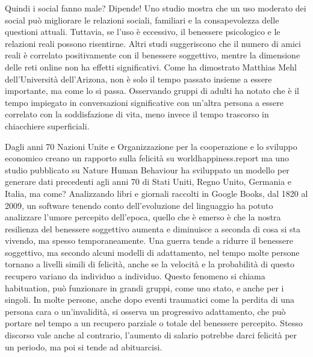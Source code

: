\documentclass[12pt]{book} %
\begin{document}
\begin{mdframed}[linewidth=1pt]
Quindi i social fanno male? Dipende! Uno studio mostra che un uso moderato dei social può migliorare le relazioni sociali, familiari e la consapevolezza delle questioni attuali. Tuttavia, se l’uso è eccessivo, il benessere psicologico e le relazioni reali possono risentirne. Altri studi  suggeriscono che il numero di amici reali è correlato positivamente con il benessere soggettivo, mentre la dimensione delle reti online non ha effetti significativi.
Come ha dimostrato Matthias Mehl dell'Università dell'Arizona, non è solo il tempo passato
insieme a essere importante, ma come lo si passa. Osservando gruppi di adulti ha notato che è il tempo impiegato in
conversazioni significative con un'altra persona a essere correlato con la soddisfazione di vita, meno invece il tempo trascorso in chiacchiere superficiali. 
\end{mdframed}

Dagli anni 70 Nazioni Unite e Organizzazione per la cooperazione e lo sviluppo economico creano un rapporto sulla
felicità su worldhappiness.report ma uno studio pubblicato su Nature Human
Behaviour ha sviluppato un modello per generare dati
precedenti agli anni 70 di Stati Uniti, Regno Unito, Germania e Italia, ma come? Analizzando libri e giornali raccolti
in Google Books, dal 1820 al 2009, un software tenendo conto dell'evoluzione del linguaggio ha
potuto analizzare l'umore percepito dell'epoca, quello che è emerso è che la
nostra resilienza del benessere soggettivo aumenta e diminuisce a seconda di cosa si sta vivendo, ma spesso temporaneamente. Una guerra tende a ridurre il benessere soggettivo, ma secondo alcuni modelli di adattamento, nel tempo molte persone tornano a livelli simili di felicità, anche se la velocità e la probabilità di questo recupero variano da individuo a individuo. Questo fenomeno si chiama habituation, può funzionare in grandi gruppi, come uno
stato, e anche per i singoli. In molte persone, anche dopo eventi traumatici come la perdita di una persona cara o un’invalidità, si osserva un progressivo adattamento, che può portare nel tempo a un recupero parziale o totale del benessere percepito. Stesso discorso vale anche
al contrario, l'aumento di salario potrebbe darci felicità per un periodo, ma poi si tende ad abituarcisi.
\end{document}
